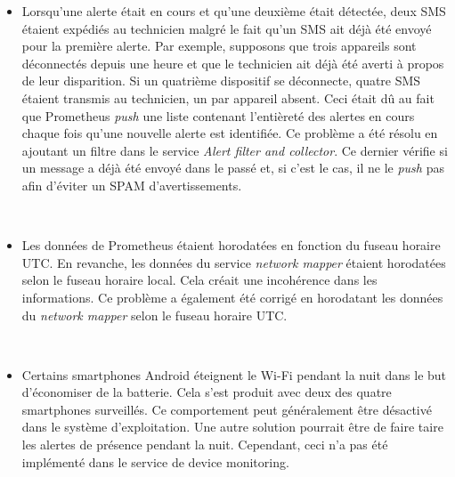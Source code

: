 \vspace{0.1cm}
\begin{itemize}
  \item Lorsqu'une alerte était en cours et qu'une deuxième était détectée, deux SMS étaient expédiés au technicien malgré le fait qu'un SMS ait déjà été envoyé pour la première alerte. Par exemple, supposons que trois appareils sont déconnectés depuis une heure et que le technicien ait déjà été averti à propos de leur disparition. Si un quatrième dispositif se déconnecte, quatre SMS étaient transmis au technicien, un par appareil absent. Ceci était dû au fait que Prometheus \textit{push} une liste contenant l'entièreté des alertes en cours chaque fois qu'une nouvelle alerte est identifiée. Ce problème a été résolu en ajoutant un filtre dans le service \textit{Alert filter and collector}. Ce dernier vérifie si un message a déjà été envoyé dans le passé et, si c'est le cas, il ne le \textit{push} pas afin d'éviter un SPAM d'avertissements.

  ~

  \item Les données de Prometheus étaient horodatées en fonction du fuseau horaire UTC. En revanche, les données du service \textit{network mapper} étaient horodatées selon le fuseau horaire local. Cela créait une incohérence dans les informations. Ce problème a également été corrigé en horodatant les données du \textit{network mapper} selon le fuseau horaire UTC.

  ~

  \item Certains smartphones Android éteignent le Wi-Fi pendant la nuit dans le but d'économiser de la batterie. Cela s'est produit avec deux des quatre smartphones surveillés. Ce comportement peut généralement être désactivé dans le système d'exploitation. Une autre solution pourrait être de faire taire les alertes de présence pendant la nuit. Cependant, ceci n'a pas été implémenté dans le service de device monitoring.

  ~


\end{itemize}
